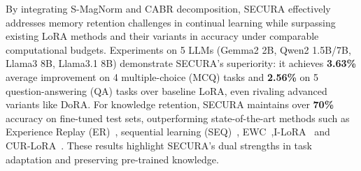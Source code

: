 By integrating S-MagNorm and CABR decomposition, SECURA effectively addresses memory retention challenges in continual learning while surpassing existing LoRA methods and their variants in accuracy under comparable computational budgets. Experiments on 5 LLMs (Gemma2 2B, Qwen2 1.5B/7B, Llama3 8B, Llama3.1 8B) demonstrate SECURA's superiority: it achieves \textbf{3.63\%} average improvement on 4 multiple-choice (MCQ) tasks and \textbf{2.56\%} on 5 question-answering (QA) tasks over baseline LoRA, even rivaling advanced variants like DoRA. For knowledge retention, SECURA maintains over \textbf{70\%} accuracy on fine-tuned test sets, outperforming state-of-the-art methods such as Experience Replay (ER)~\citep{fedus2020revisitingfundamentalsexperiencereplay}, sequential learning (SEQ)~\citep{sutskever2014sequencesequencelearningneural}, EWC~\citep{aich2021elasticweightconsolidationewc},I-LoRA~\citep{ren2024analyzingreducingcatastrophicforgetting} and CUR-LoRA~\citep{https://doi.org/10.5281/zenodo.12730055}. These results highlight SECURA's dual strengths in task adaptation and preserving pre-trained knowledge.
